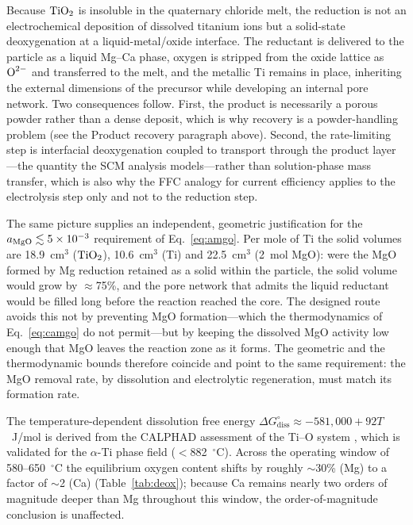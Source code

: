 \documentclass[pdflatex,sn-basic,Numbered]{sn-jnl}
\begin{document}
Because $\ce{TiO2}$ is insoluble in the quaternary chloride melt, the reduction is not an electrochemical deposition of dissolved titanium ions but a solid-state deoxygenation at a liquid-metal/oxide interface. The reductant is delivered to the particle as a liquid Mg--Ca phase, oxygen is stripped from the oxide lattice as $\ce{O^{2-}}$ and transferred to the melt, and the metallic Ti remains in place, inheriting the external dimensions of the precursor while developing an internal pore network. Two consequences follow. First, the product is necessarily a porous powder rather than a dense deposit, which is why recovery is a powder-handling problem (see the Product recovery paragraph above). Second, the rate-limiting step is interfacial deoxygenation coupled to transport through the product layer---the quantity the SCM analysis models---rather than solution-phase mass transfer, which is also why the FFC analogy for current efficiency applies to the electrolysis step only and not to the reduction step.

The same picture supplies an independent, geometric justification for the $a_{\ce{MgO}} \lesssim 5\times10^{-3}$ requirement of Eq.~\ref{eq:amgo}. Per mole of Ti the solid volumes are 18.9~cm$^3$ ($\ce{TiO2}$), 10.6~cm$^3$ (Ti) and 22.5~cm$^3$ (2~mol MgO): were the MgO formed by Mg reduction retained as a solid within the particle, the solid volume would grow by $\approx$75\%, and the pore network that admits the liquid reductant would be filled long before the reaction reached the core. The designed route avoids this not by preventing MgO formation---which the thermodynamics of Eq.~\ref{eq:camgo} do not permit---but by keeping the dissolved MgO activity low enough that MgO leaves the reaction zone as it forms. The geometric and the thermodynamic bounds therefore coincide and point to the same requirement: the MgO removal rate, by dissolution and electrolytic regeneration, must match its formation rate.

The temperature-dependent dissolution free energy $\Delta G^{\circ}_{\mathrm{diss}} \approx -581{,}000 + 92T$~J/mol is derived from the CALPHAD assessment of the Ti--O system \cite{waldner1999}, which is validated for the $\alpha$-Ti phase field ($<$882~$^{\circ}$C). Across the operating window of 580--650~$^{\circ}$C the equilibrium oxygen content shifts by roughly $\sim$30\% (Mg) to a factor of $\sim$2 (Ca) (Table~\ref{tab:deox}); because Ca remains nearly two orders of magnitude deeper than Mg throughout this window, the order-of-magnitude conclusion is unaffected.
\end{document}
